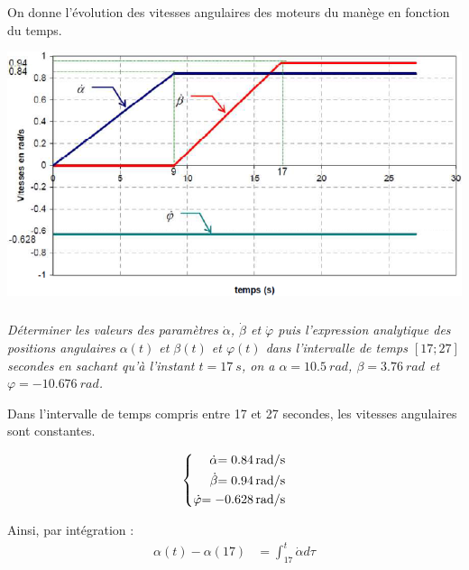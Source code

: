 \documentclass[10pt,fleqn]{article} %
\begin{document}
\begin{multicols}{2}
\vspace{.3cm}

On donne l'évolution des vitesses angulaires des moteurs du manège en fonction du temps.
\begin{center}
\includegraphics[width=\linewidth]{images/img2}
\end{center}

\subparagraph{\label{lab}}
\textit{Déterminer les valeurs des paramètres $\dot{\alpha}$, $\dot{\beta}$ et $\dot{\varphi}$
puis l'expression analytique des positions angulaires $\alpha(t)$ et $\beta(t)$ et $\varphi(t)$ dans l'intervalle de temps $[17;27]$ secondes en sachant qu'à l'instant $t=\SI{17}{s}$, on a $\alpha=\SI{10,5}{rad}$, $\beta=\SI{3,76}{rad}$ et $\varphi=-\SI{10,676}{rad}$.}
\ifprof
\begin{corrige}

Dans l'intervalle de temps compris entre 17 et 27 secondes, les vitesses angulaires sont constantes.

$$
\left\{ \begin{aligned} 
{\dot\alpha}{=\SI{0,84}{rad/s}}\\
{\dot\beta}{=\SI{0,94}{rad/s}}\\
{\dot\varphi}{=-\SI{0,628}{rad/s}}
 \end{aligned}\right.
$$

Ainsi, par intégration :
\begin{align*}
\alpha (t)-\alpha(17)&=\int_{17}^t \dot\alpha d\tau \\
\end{align*}
\end{corrige}\else\fi


\end{multicols}
\end{document}
